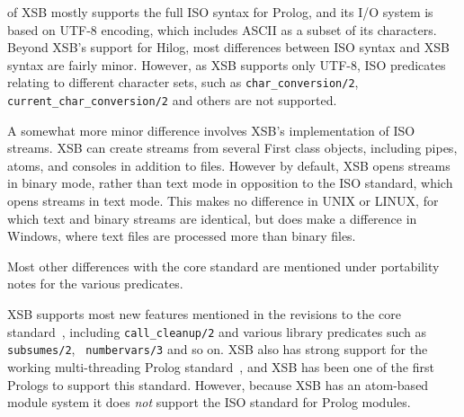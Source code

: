 \version{} of XSB mostly supports the full ISO syntax for Prolog, and
its I/O system is based on UTF-8 encoding, which includes ASCII as a
subset of its characters.  Beyond XSB's support for Hilog, most
differences between ISO syntax and XSB syntax are fairly minor.
However, as XSB supports only UTF-8, ISO predicates relating to
different character sets, such as {\tt char\_conversion/2}, {\tt
  current\_char\_conversion/2} and others are not supported.

A somewhat more minor difference involves XSB's implementation of ISO
streams.  XSB can create streams from several First class objects,
including pipes, atoms, and consoles in addition to files.  However by
default, XSB opens streams in binary mode, rather than text mode in
opposition to the ISO standard, which opens streams in text mode.
This makes no difference in UNIX or LINUX, for which text and binary
streams are identical, but does make a difference in Windows, where
text files are processed more than binary files.


Most other differences with the core standard are mentioned under
portability notes for the various predicates.  


XSB supports most new features mentioned in the revisions to the core
standard~\cite{ISO-Revision}, including {\tt call\_cleanup/2} and
various library predicates such as {\tt subsumes/2}, {\tt
  numbervars/3} and so on.  XSB also has strong support for the
working multi-threading Prolog standard~\cite{Prolog-MT-ISO}, and XSB
has been one of the first Prologs to support this standard.  However,
because XSB has an atom-based module system it does {\em not} support
the ISO standard for Prolog modules.

